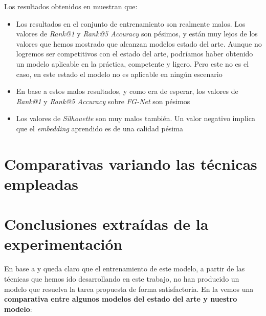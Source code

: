 Los resultados obtenidos en  muestran que:

\begin{itemize}
    \item Los resultados en el conjunto de entrenamiento son realmente malos. Los valores de \textit{Rank@1} y \textit{Rank@5 Accuracy} son pésimos, y están muy lejos de los valores que hemos mostrado que alcanzan modelos estado del arte. Aunque no logremos ser competitivos con el estado del arte, podríamos haber obtenido un modelo aplicable en la práctica, competente y ligero. Pero este no es el caso, en este estado el modelo no es aplicable en ningún escenario
    \item En base a estos malos resultados, y como era de esperar, los valores de \textit{Rank@1} y \textit{Rank@5 Accuracy} sobre \textit{FG-Net} son pésimos
    \item Los valores de \textit{Silhouette} son muy malos también. Un valor negativo implica que el \textit{embedding} aprendido es de una calidad pésima
\end{itemize}

\section{Comparativas variando las técnicas empleadas} \label{isec:experimentacion_variar_tecnicas}

\section{Conclusiones extraídas de la experimentación} \label{isec:conclusiones_experimentacion}

En base a  y  queda claro que el entrenamiento de este modelo, a partir de las técnicas que hemos ido desarrollando en este trabajo, no han producido un modelo que resuelva la tarea propuesta de forma satisfactoria. En la  vemos una \textbf{comparativa entre algunos modelos del estado del arte y nuestro modelo}:

